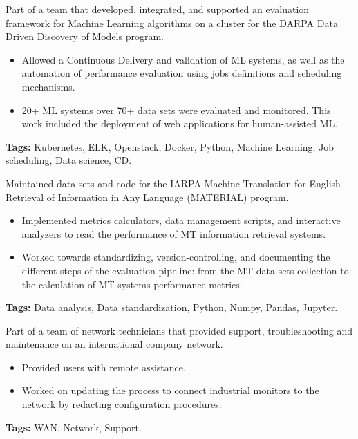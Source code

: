 \documentclass[10pt,a4paper,ragged2e]{altacv}
\begin{document}
\divider

   \hfill {} \hspace{5em}\vspace{0.3em}\vspace{0.3em}\break
Part of a team that developed, integrated, and supported an evaluation framework for Machine Learning algorithms on a cluster for the DARPA Data Driven Discovery of Models program.
\begin{itemize}
\item Allowed a Continuous Delivery and validation of ML systems, as well as the automation of performance evaluation using jobs definitions and scheduling mechanisms.
\item 20+ ML systems over 70+ data sets were evaluated and monitored. This work included the deployment of web applications for human-assisted ML.
\end{itemize}
\textbf{\color{accent}Tags:} Kubernetes, ELK, Openstack, Docker, Python, Machine Learning, Job scheduling, Data science, CD.

\divider

 \hfill
{}\hspace{5em}\vspace{0.3em}\vspace{0.3em}\break
Maintained data sets and code for the IARPA Machine Translation for English Retrieval of Information in Any Language (MATERIAL) program.

\begin{itemize}
\item Implemented metrics calculators, data management scripts, and interactive analyzers to read the performance of MT information retrieval systems.
\item Worked towards standardizing, version-controlling, and documenting the different steps of the evaluation pipeline: from the MT data sets collection to the calculation of MT systems performance metrics.
\end{itemize}
\textbf{\color{accent}Tags:} Data analysis, Data standardization, Python, Numpy, Pandas, Jupyter.

\divider

\vspace{0.3em}\break
\begin{small}
Part of a team of network technicians that provided support, troubleshooting and maintenance on an international company network.
\begin{itemize}
 \item Provided users with remote assistance.
 
 \item Worked on updating the process to connect industrial monitors to the network by redacting configuration procedures.
\end{itemize}
\textbf{\color{accent}Tags:} WAN, Network, Support.
\end{small}
\end{document}
